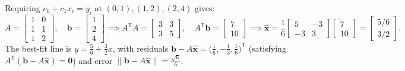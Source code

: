 \documentclass[10pt]{scrartcl}
\newcommand{\vv}[1]{\mathbf{#1}}
\begin{document}
 Requiring $c_0+c_1x_i=y_i$ at $(0,1),(1,2),(2,4)$ gives:
\[
  A=\begin{bmatrix}1&0\\1&1\\1&2\end{bmatrix},\quad \vv b=\begin{bmatrix}1\\2\\4\end{bmatrix}
  \implies
  A^{\mathsf T}A=\begin{bmatrix}3&3\\3&5\end{bmatrix},\quad A^{\mathsf T}\vv b=\begin{bmatrix}7\\10\end{bmatrix}
  \implies
  \hat{\vv x}=\frac16\begin{bmatrix}5&-3\\-3&3\end{bmatrix}\begin{bmatrix}7\\10\end{bmatrix}=\begin{bmatrix}5/6\\3/2\end{bmatrix}.
\]
The best-fit line is $y=\frac56+\frac32 x$, with residuals $\vv b-A\hat{\vv x}=\bigl(\frac16,-\frac13,\frac16\bigr)^{\mathsf T}$ (satisfying $A^{\mathsf T}(\vv b-A\hat{\vv x})=\vv 0$) and error $\|\vv b-A\hat{\vv x}\|=\frac{\sqrt{6}}{6}$.
\end{document}
